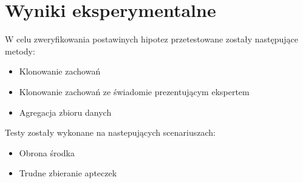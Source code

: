 \chapter{Wyniki eksperymentalne}

W celu zweryfikowania postawinych hipotez przetestowane zostały następujące metody:

\begin{itemize}
\item{Klonowanie zachowań}
\item{Klonowanie zachowań ze świadomie prezentującym ekspertem}
\item{Agregacja zbioru danych}
\end{itemize}

Testy zostały wykonane na nastepujących scenariuszach:

\begin{itemize}
\item{Obrona środka}
\item{Trudne zbieranie apteczek}
\end{itemize}









